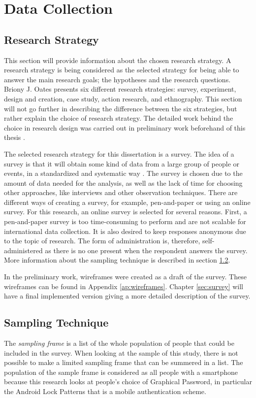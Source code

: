 \chapter{Data Collection}\label{chap:experiment}

  \section{Research Strategy}\label{sec:researchStrategy}
    This section will provide information about the chosen research strategy. A research strategy is being considered as the selected strategy for being able to answer the main research goals; the hypotheses and the research questions. Briony J. Oates \cite{empiriske} presents six different research strategies: survey, experiment, design and creation, case study, action research, and ethnography. This section will not go further in describing the difference between the six strategies, but rather explain the choice of research strategy. The detailed work behind the choice in research design was carried out in preliminary work beforehand of this thesis \cite{prosjektoppgave}.

    The selected research strategy for this dissertation is a survey. The idea of a survey is that it will obtain some kind of data from a large group of people or events, in a standardized and systematic way \cite{empiriske}. The survey is chosen due to the amount of data needed for the analysis, as well as the lack of time for choosing other approaches, like interviews and other observation techniques. There are different ways of creating a survey, for example, pen-and-paper or using an online survey. For this research, an online survey is selected for several reasons. First, a pen-and-paper survey is too time-consuming to perform and are not scalable for international data collection. It is also desired to keep responses anonymous due to the topic of research. The form of administration is, therefore, self-administered as there is no one present when the respondent answers the survey. More information about the sampling technique is described in section \ref{sec:samplingTechnique}.

    In the preliminary work, wireframes were created as a draft of the survey. These wireframes can be found in Appendix \ref{ap:wireframes}. Chapter \ref{sec:survey} will have a final implemented version giving a more detailed description of the survey.

  \section{Sampling Technique}\label{sec:samplingTechnique}
    The {\it sampling frame} is a list of the whole population of people that could be included in the survey. When looking at the sample of this study, there is not possible to make a limited sampling frame that can be summered in a list. The population of the sample frame is considered as all people with a smartphone because this research looks at people's choice of Graphical Password, in particular the Android Lock Patterns that is a mobile authentication scheme.

